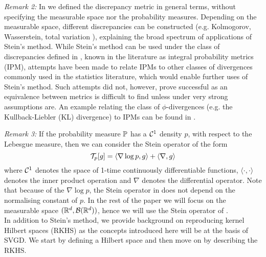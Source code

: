 \emph{Remark 2:} In  we defined the discrepancy metric in general terms, without specifying the measurable space nor the probability measures. Depending on the measurable space, different discrepancies can be constructed (e.g. Kolmogorov, Wasserstein, total variation \cite{ross2011fundamentals}), explaining the broad spectrum of applications of Stein's method. While Stein's method can be used under the class of discrepancies defined in , known in the literature as integral probability metrics (IPM), attempts have been made to relate IPMs to other classes of divergences commonly used in the statistics literature, which would enable further uses of Stein's method. Such attempts did not, however, prove successful as an equivalence between metrics is difficult to find unless under very strong assumptions are. An example relating the class of $\phi$-divergences (e.g. the Kullback-Liebler (KL) divergence) to IPMs can be found in \cite{sriperumbudur2009integral}.

\emph{Remark 3:} If the probability measure $\mathbb{P}$ has a $\mathcal{C}^1$ density $p$, with respect to the Lebesgue measure, then we can consider the Stein operator of the form 
\begin{equation}\label{score_function}
\mathcal{T}_{p}[g] = \langle \nabla \log p, g \rangle + \langle \nabla, g\rangle
\end{equation}
where $\mathcal{C}^1$ denotes the space of 1-time continuously differentiable functions, $\langle \cdot, \cdot \rangle$ denotes the inner product operation and $\nabla$ denotes the differential operator. Note that because of the $\nabla \log p$, the Stein operator in  does not depend on the normalising constant of $p$. In the rest of the paper we will focus on the measurable space $(\mathbb{R}^d, \mathcal{B}(\mathbb{R}^d))$, hence we will use the Stein operator of .
\\

\noindent In addition to Stein's method, we provide background on reproducing kernel Hilbert spaces (RKHS) as the concepts introduced here will be at the basis of SVGD. We start by defining a Hilbert space and then move on by describing the RKHS.

